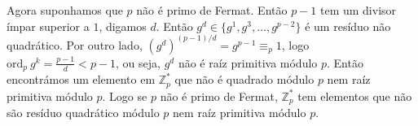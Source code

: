 \documentclass[repertorio-solutions-1.tex]{subfiles}
\renewcommand*{\ord}[1]{\ensuremath{\text{ord}_#1\:}}
\begin{document}
\begin{solution}
Agora suponhamos que $p$ não é primo de Fermat.
Então $p-1$ tem um divisor ímpar superior a $1$, digamos $d$.
Então $g^d\in\{g^1,g^3,\dots,g^{p-2}\}$ é um resíduo não quadrático.
Por outro lado, $(g^d)^{(p-1)/d}=g^{p-1}\equiv_p 1$, logo
$\ord{p}g^k=\frac{p-1}{d}<p-1$, ou seja, $g^d$ não é raíz primitiva
módulo $p$.
Então encontrámos um elemento em $\mathbb{Z}_p^*$ que não é quadrado
módulo $p$ nem raíz primitiva módulo $p$.
Logo se $p$ não é primo de Fermat, $\mathbb{Z}_p^*$ tem elementos que
não são resíduo quadrático módulo $p$ nem raíz primitiva módulo $p$. 
\end{solution}
\end{document}
